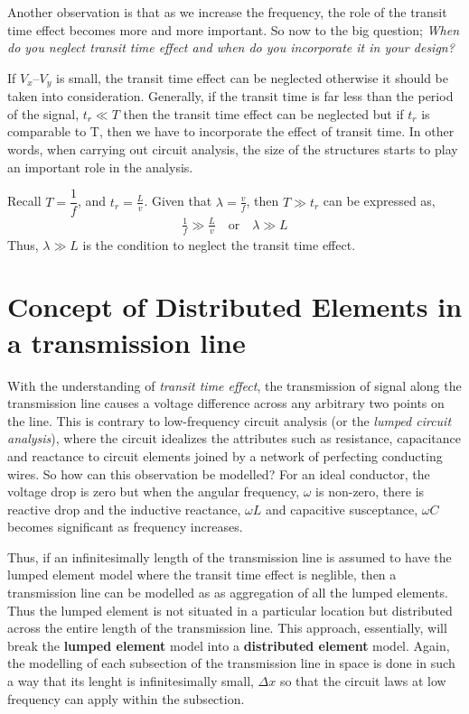 Another observation is that as we increase the frequency, the role of the transit time effect becomes more and more important. So now to the big question; \textit{When do you neglect transit time effect and when do you incorporate it in your design?}

If $ V_{x} – V_{y} $ is small, the transit time effect can be neglected otherwise it should be taken into consideration. Generally, if the transit time is far less than the period of the signal,  $ t_{r} \ll T $ then the  transit time effect can be neglected but if $ t_{r} $ is comparable to T, then we have to incorporate the effect of transit time. In other words, when carrying out circuit analysis, the size of the structures starts to play an important role in the analysis.

Recall $T = \dfrac{1}{f} $, and $t_{r} = \frac{L}{v}$. Given that $ \lambda = \frac{v}{f} $, then $T \gg t_r$ can be expressed as, 
\begin{align*}
\frac{1}{f} \gg \frac{L}{v}\quad\text{or}\quad\lambda \gg L
\end{align*}
Thus, $ \lambda \gg L $ is the condition to neglect the transit time effect.

\section{Concept of Distributed Elements in a transmission line}
With the understanding of \textit{transit time effect}, the transmission of signal along the transmission line causes a voltage difference across any arbitrary two points on the line. This is contrary to low-frequency circuit analysis (or the \textit{lumped circuit analysis}), where the circuit idealizes the attributes such as resistance, capacitance and reactance to circuit elements joined by a network of perfecting conducting wires. So how can this observation be modelled? For an ideal conductor, the voltage drop is zero but when the angular frequency, $\omega$ is non-zero, there is reactive drop and the inductive reactance, $\omega L$ and capacitive susceptance, $\omega C$ becomes significant as frequency increases.

Thus, if an infinitesimally length of the transmission line is assumed to have the lumped element model where the transit time effect is neglible, then a transmission line can be modelled as as aggregation of all the lumped elements. Thus the lumped element is not situated in a particular location but distributed across the entire length of the transmission line. This approach, essentially, will break the \textbf{lumped element} model into a \textbf{distributed element} model. Again, the modelling of each subsection of the transmission line in space is done in such a way that its lenght is infinitesimally small, $\Delta x$ so that the circuit laws at low frequency can apply within the subsection.


